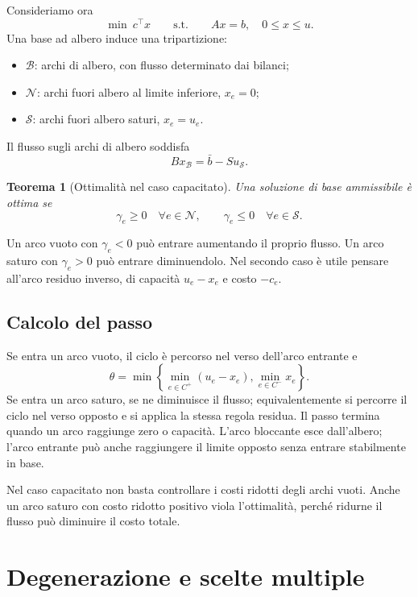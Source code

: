\documentclass[11pt,a4paper]{article}
\newtheorem{theorem}[definition]{Teorema}
\newcommand{\Bset}{\mathcal{B}}
\newcommand{\Nset}{\mathcal{N}}
\newcommand{\Sset}{\mathcal{S}}
\begin{document}
Consideriamo ora
\begin{equation}\label{eq:cap}
\min\ c^\top x\qquad\text{s.t.}\qquad Ax=b,\quad 0\leq x\leq u.
\end{equation}
Una base ad albero induce una tripartizione:
\begin{itemize}
\item $\Bset$: archi di albero, con flusso determinato dai bilanci;
\item $\Nset$: archi fuori albero al limite inferiore, $x_e=0$;
\item $\Sset$: archi fuori albero saturi, $x_e=u_e$.
\end{itemize}
Il flusso sugli archi di albero soddisfa
\[
B x_{\Bset}=\bar b-Su_{\Sset}.
\]

\begin{theorem}[Ottimalità nel caso capacitato]
Una soluzione di base ammissibile è ottima se
\[
\gamma_e\geq0\quad\forall e\in\Nset,
\qquad
\gamma_e\leq0\quad\forall e\in\Sset.
\]
\end{theorem}

Un arco vuoto con $\gamma_e<0$ può entrare aumentando il proprio flusso. Un arco saturo con $\gamma_e>0$ può entrare diminuendolo. Nel secondo caso è utile pensare all'arco residuo inverso, di capacità $u_e-x_e$ e costo $-c_e$.

\subsection{Calcolo del passo}

Se entra un arco vuoto, il ciclo è percorso nel verso dell'arco entrante e
\[
\theta=\min\left\{
\min_{e\in C^+}(u_e-x_e),
\min_{e\in C^-}x_e
\right\}.
\]
Se entra un arco saturo, se ne diminuisce il flusso; equivalentemente si percorre il ciclo nel verso opposto e si applica la stessa regola residua. Il passo termina quando un arco raggiunge zero o capacità. L'arco bloccante esce dall'albero; l'arco entrante può anche raggiungere il limite opposto senza entrare stabilmente in base.

\begin{warningbox}
Nel caso capacitato non basta controllare i costi ridotti degli archi vuoti. Anche un arco saturo con costo ridotto positivo viola l'ottimalità, perché ridurne il flusso può diminuire il costo totale.
\end{warningbox}

\section{Degenerazione e scelte multiple}
\end{document}
